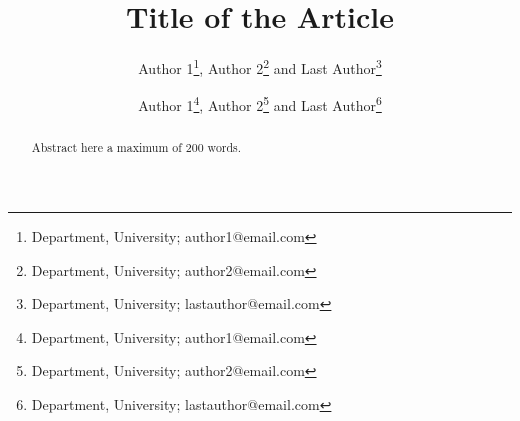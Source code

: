 \documentclass{mapana}
\begin{document}
\title{Title of the Article}


\author{Author 1\thanks{Department, University; author1@email.com}, Author 2\thanks{Department, University; author2@email.com} and Last Author\thanks{Department, University; lastauthor@email.com}}



\maketitle


\begin{abstract}
	Abstract here a maximum of 200 words.
\end{abstract}





\author{Author 1\thanks{Department, University; author1@email.com}, Author 2\thanks{Department, University; author2@email.com} and Last Author\thanks{Department, University; lastauthor@email.com}}



\end{document}
